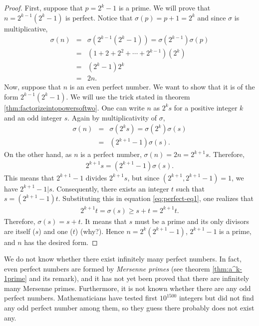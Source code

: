 \documentclass[12pt]{subfile}
\begin{document}
	\begin{proof}
		First, suppose that $p=2^k-1$ is a prime. We will prove that $n=2^{k-1}(2^k-1)$ is perfect. Notice that $\sigma(p)=p+1=2^k$ and since $\sigma$ is multiplicative,
		\begin{eqnarray*}
			\sigma(n) &=& \sigma\left(2^{k-1}(2^k-1)\right) = \sigma(2^{k-1}) \sigma(p)\\
					  &=& \left(1+2+2^2+\cdots+2^{k-1}\right) \left(2^k\right)\\
					  &=& \left(2^k-1\right) 2^k\\
					  &=& 2n.
		\end{eqnarray*}
		Now, suppose that $n$ is an even perfect number. We want to show that it is of the form $2^{k-1}(2^k-1)$. We will use the trick stated in theorem \ref{thm:factorizeintopowersoftwo}. One can write $n$ as $2^ks$ for a positive integer $k$ and an odd integer $s$. Again by multiplicativity of $\sigma$,
		\begin{eqnarray*}
			\sigma(n) &=&  \sigma(2^k s) = \sigma(2^k)\sigma(s)\\
					  &=& \left(2^{k+1}-1\right) \sigma(s).
		\end{eqnarray*}
		On the other hand, as $n$ is a perfect number, $\sigma(n)=2n = 2^{k+1}s$. Therefore,
		\begin{align}
			2^{k+1}s = \left(2^{k+1}-1\right) \sigma(s). \label{eq:perfect-eq1}
		\end{align}
		This means that $2^{k+1}-1$ divides $2^{k+1}s$, but since $(2^{k+1}, 2^{k+1}-1)= 1$, we have $2^{k+1}-1|s$. Consequently, there exists an integer $t$ such that $s = \left(2^{k+1}-1\right) t$.  Substituting this in equation \ref{eq:perfect-eq1}, one realizes that
		\begin{align*}
			2^{k+1}t = \sigma(s) \geq s +t = 2^{k+1}t.
		\end{align*}
		Therefore, $\sigma(s)=s+t$. It means that $s$ must be a prime and its only divisors are itself ($s$) and one ($t$) (why?). Hence $n=2^k(2^{k+1}-1)$,  $2^{k+1}-1$ is a prime, and $n$ has the desired form.
	\end{proof}

	\begin{remark}
		We do not know whether there exist infinitely many perfect numbers. In fact, even perfect numbers are formed by \textit{Mersenne primes} (see theorem \ref{thm:a^k-1prime} and its remark), and it has not yet been proved that there are infinitely many Mersenne primes. Furthermore, it is not known whether there are any odd perfect numbers. Mathematicians have tested first $10^{1500}$ integers but did not find any odd perfect number among them, so they guess there probably does not exist any.
	\end{remark}
\end{document}

